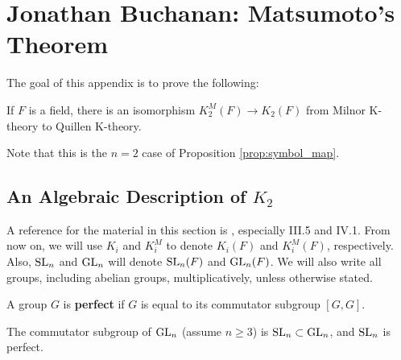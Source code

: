 \def\St{\mathrm{St}}

\section{Jonathan Buchanan: Matsumoto's Theorem}\label{sec:jonathan}
The goal of this appendix is to prove the following:
\begin{theorem}
    \label{thm:matsumoto}
    If $F$ is a field, there is an isomorphism $K_2^M(F) \to K_2(F)$ from Milnor K-theory to Quillen K-theory.
\end{theorem}
Note that this is the $n = 2$ case of Proposition \ref{prop:symbol_map}.

\subsection{An Algebraic Description of $K_2$}
A reference for the material in this section is \cite{Kbook}, especially III.5 and IV.1. From now on, we will use $K_i$ and $K_i^M$ to denote $K_i(F)$ and $K_i^M(F)$, respectively. Also, $\mathrm{SL}_n$ and $\mathrm{GL}_n$ will denote $\mathrm{SL}_n(F)$ and $\mathrm{GL}_n(F)$. We will also write all groups, including abelian groups, multiplicatively, unless otherwise stated.

\begin{definition}
    A group $G$ is \textbf{perfect} if $G$ is equal to its commutator subgroup $[G, G]$.
\end{definition}
\begin{example}
    The commutator subgroup of $\mathrm{GL}_n$ (assume $n \geq 3$) is $\mathrm{SL}_n \subset \mathrm{GL}_n$, and $\mathrm{SL}_n$ is perfect.
\end{example}

